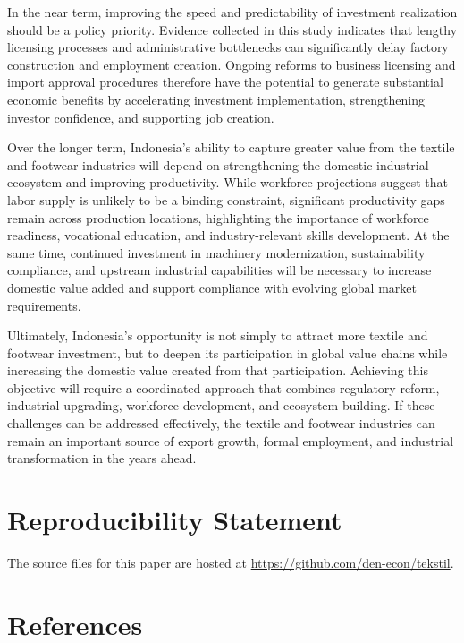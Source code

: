 \documentclass[
  manuscript=article,
  layout=publish,
  year=2026,
  volume=1,
]{den}
\begin{document}
In the near term, improving the speed and predictability of investment
realization should be a policy priority. Evidence collected in this
study indicates that lengthy licensing processes and administrative
bottlenecks can significantly delay factory construction and employment
creation. Ongoing reforms to business licensing and import approval
procedures therefore have the potential to generate substantial economic
benefits by accelerating investment implementation, strengthening
investor confidence, and supporting job creation.

Over the longer term, Indonesia's ability to capture greater value from
the textile and footwear industries will depend on strengthening the
domestic industrial ecosystem and improving productivity. While
workforce projections suggest that labor supply is unlikely to be a
binding constraint, significant productivity gaps remain across
production locations, highlighting the importance of workforce
readiness, vocational education, and industry-relevant skills
development. At the same time, continued investment in machinery
modernization, sustainability compliance, and upstream industrial
capabilities will be necessary to increase domestic value added and
support compliance with evolving global market requirements.

Ultimately, Indonesia's opportunity is not simply to attract more
textile and footwear investment, but to deepen its participation in
global value chains while increasing the domestic value created from
that participation. Achieving this objective will require a coordinated
approach that combines regulatory reform, industrial upgrading,
workforce development, and ecosystem building. If these challenges can
be addressed effectively, the textile and footwear industries can remain
an important source of export growth, formal employment, and industrial
transformation in the years ahead.

\section*{Reproducibility Statement}\label{reproducibility-statement}

The source files for this paper are hosted at
\url{https://github.com/den-econ/tekstil}.

\section*{References}\label{references}
\end{document}
